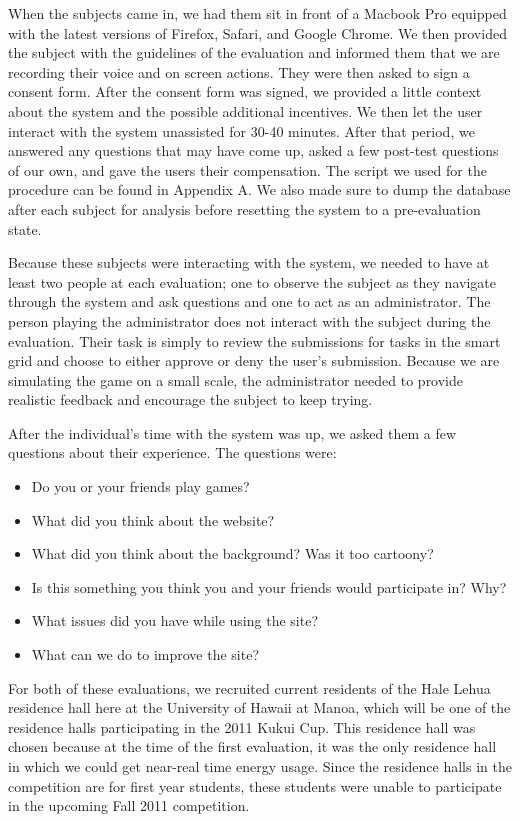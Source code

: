 When the subjects came in, we had them sit in front of a Macbook Pro equipped with the latest versions of Firefox, Safari, and Google Chrome.  We then provided the subject with the guidelines of the evaluation and informed them that we are recording their voice and on screen actions.  They were then asked to sign a consent form. After the consent form was signed, we provided a little context about the system and the possible additional incentives. We then let the user interact with the system unassisted for 30-40 minutes.  After that period, we answered any questions that may have come up, asked a few post-test questions of our own, and gave the users their compensation.  The script we used for the procedure can be found in Appendix A. We also made sure to dump the database after each subject for analysis before resetting the system to a pre-evaluation state.

Because these subjects were interacting with the system, we needed to have at least two people at each evaluation; one to observe the subject as they navigate through the system and ask questions and one to act as an administrator.  The person playing the administrator does not interact with the subject during the evaluation.  Their task is simply to review the submissions for tasks in the smart grid and choose to either approve or deny the user's submission.  Because we are simulating the game on a small scale, the administrator needed to provide realistic feedback and encourage the subject to keep trying.

After the individual's time with the system was up, we asked them a few questions about their experience. The questions were:

\begin{itemize}
    \item Do you or your friends play games?
    \item What did you think about the website?
    \item What did you think about the background? Was it too cartoony?
    \item Is this something you think you and your friends would participate in? Why?
    \item What issues did you have while using the site?
    \item What can we do to improve the site?
\end{itemize}

For both of these evaluations, we recruited current residents of the Hale Lehua residence hall here at the University of Hawaii at Manoa, which will be one of the residence halls participating in the 2011 Kukui Cup.  This residence hall was chosen because at the time of the first evaluation, it was the only residence hall in which we could get near-real time energy usage.  Since the residence halls in the competition are for first year students, these students were unable to participate in the upcoming Fall 2011 competition.

